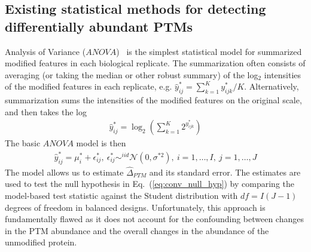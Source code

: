 \documentclass[mcp]{article}
\numberwithin{table}{section}
\def\eqref#1{Eq.~(\ref{eq:#1})}
\begin{document}
\subsection*{Existing statistical methods for detecting differentially abundant PTMs}


\medskip \noindent 

Analysis of Variance ($ANOVA$)~\cite{kutner_etal_04a} is the simplest statistical model for summarized modified features in each biological replicate. The summarization often consists of averaging (or taking the median or other robust summary) of the log$_2$ intensities of the modified features in each replicate, e.g. $\hat{y}^*_{ij} = \sum_{k=1}^K{y_{ijk}^{\ast}}/K$. Alternatively, summarization sums the intensities of the modified features on the original scale, and then takes the log
\begin{eqnarray}
\hat{y}^*_{ij} =  \log_2 \left(\sum_{k=1}^{K} 2^{y_{ijk}^{\ast}}\right)
\label{eq:anova_summ}
\end{eqnarray}
The basic $ANOVA$ model  is then
\begin{eqnarray}
\hat{y}^*_{ij} = \mu^{*}_{i} + \epsilon^{\ast}_{ij}, \ \epsilon^{\ast}_{ij} \mathop\sim^{iid} \mathcal{N}(0, \sigma^{*2}),\ i=1,\ldots,I,\ j=1,\ldots,J
\label{eq:ttest_model}
\end{eqnarray}
The model allows us to estimate $\hat{\Delta}_{PTM}$ and its standard error. The estimates are used to test the null hypothesis in \eqref{conv_null_hyp} by comparing the model-based test statistic against the Student distribution with $df=I(J-1)$ degrees of freedom in balanced designs.
Unfortunately, this approach is fundamentally flawed as it does not account for the confounding between changes in the PTM abundance and the overall changes in the abundance of the unmodified protein.

\medskip \noindent 

\end{document}
